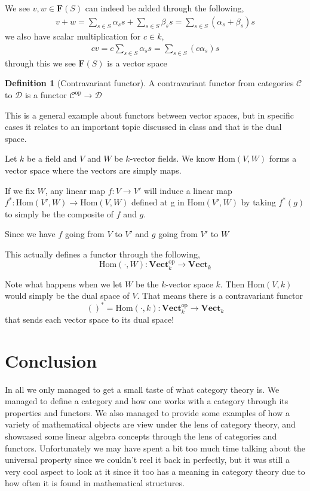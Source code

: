 \documentclass[12pt]{article}
\theoremstyle{definition}
\newtheorem{definition}{Definition}[section]
\theoremstyle{remark}
\begin{document}
    We see $v,w \in \textbf{F}(S) $ can indeed be added through the following,
    \begin{align*}
        v + w = \sum_{s\in S} \alpha_s s + \sum_{s\in S} \beta_s s = \sum_{s\in S} (\alpha_s + \beta_s) s
    \end{align*}
    we also have scalar multiplication for $c\in k$,
    \begin{align*}
        c v = c\sum_{s\in S} \alpha_s s = \sum_{s\in S} (c\alpha_s) s
    \end{align*}
    through this we see $\textbf{F}(S)$ is a vector space

    \begin{definition}[Contravariant functor]
        A contravariant functor from categories $\mathcal{C}$ to $\mathcal{D}$ is a functor $\mathcal{C}^\text{op}\to \mathcal{D}$ 
    \end{definition}

     This is a general example about functors between vector spaces, but in specific cases it relates to an important topic discussed in class and that is the dual space. 

    Let $k$ be a field and $V$ and $W$ be $k$-vector fields. We know Hom$(V,W)$ forms a vector space where the vectors are simply maps. 

    If we fix $W$, any linear map $f: V \to V'$ will induce a linear map $f^{*}: \text{Hom}(V',W) \to \text{Hom}(V,W)$ defined at g in Hom$(V',W)$ by taking $f^{*}(g)$ to simply be the composite of $f$ and $g$.

    Since we have $f$ going from $V$ to $V'$ and $g$ going from $V'$ to $W$

    This actually defines a functor through the following,\[\text{Hom}(\cdot, W): \textbf{Vect}_{k}^\text{op} \to \textbf{Vect}_k\]

    Note what happens when we let $W$ be the $k$-vector space $k$. Then Hom$(V,k)$ would simply be the dual space of $V$. That means there is a contravariant functor \[()^{*} = \text{Hom}(\cdot, k): \textbf{Vect}_k^\text{op} \to \textbf{Vect}_k\] that sends each vector space  to its dual space!

    \section{Conclusion} In all we only managed to get a small taste of what category theory is. We managed to define a category and how one works with a category through its properties and functors. We also managed to provide some examples of how a variety of mathematical objects are view under the lens of category theory, and showcased some linear algebra concepts through the lens of categories and functors. Unfortunately we may have spent a bit too much time talking about the universal property since we couldn't reel it back in perfectly, but it was still a very cool aspect to look at it since it too has a meaning in category theory due to how often it is found in mathematical structures. 
\end{document}
